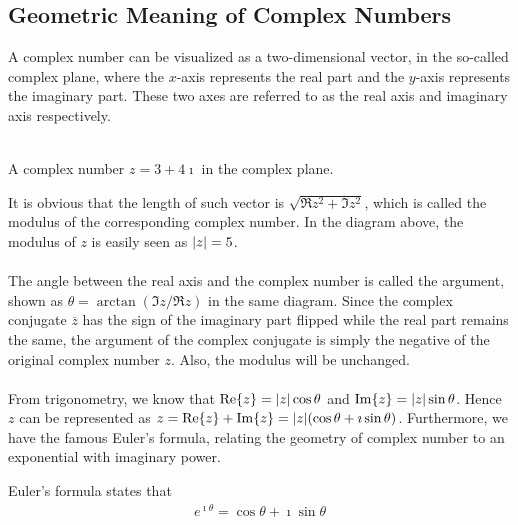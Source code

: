 \subsection{Geometric Meaning of Complex Numbers}
A complex number can be visualized as a two-dimensional vector, in the so-called complex plane, where the $x$-axis represents the real part and the $y$-axis represents the imaginary part. These two axes are referred to as the real axis and imaginary axis respectively.
\begin{center}
\\
A complex number $z = 3+4\imath$ in the complex plane.
\end{center}
It is obvious that the length of such vector is $\sqrt{\Re{z}^2 + \Im{z}^2}$, which is called the modulus of the corresponding complex number. In the diagram above, the modulus of $z$ is easily seen as $\abs{z} = 5$. \\
\\
The angle between the real axis and the complex number is called the argument, shown as $\theta = \arctan(\Im{z}/\Re{z})$ in the same diagram. Since the complex conjugate $\overline{z}$ has the sign of the imaginary part flipped while the real part remains the same, the argument of the complex conjugate is simply the negative of the original complex number $z$. Also, the modulus will be unchanged.\\
\\
From trigonometry, we know that $\Re{z} = \abs{z} \cos{\theta}$ and $\Im{z} = \abs{z} \sin{\theta}$. Hence $z$ can be represented as $z = \Re{z} + \Im{z} = \abs{z} (\cos \theta + \imath \sin \theta)$. Furthermore, we have the famous Euler's formula, relating the geometry of complex number to an exponential with imaginary power.
\begin{defn}
\label{Euler}
Euler's formula states that
\begin{align*}
e^{\imath \theta} = \cos \theta + \imath \sin \theta
\end{align*}
\end{defn}

